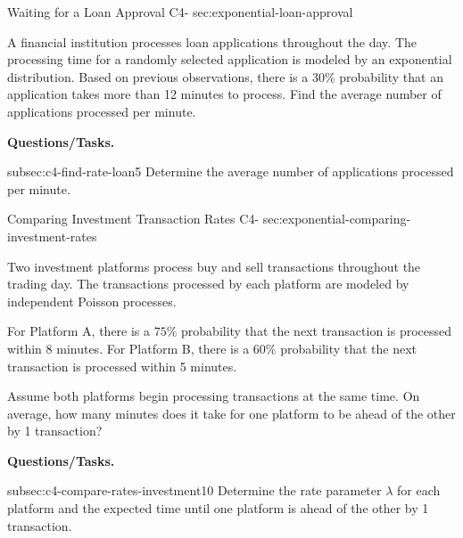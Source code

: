	
	
	\sectionScored
	{Waiting for a Loan Approval}
	{C4-}
	{sec:exponential-loan-approval}
	{
		A financial institution processes loan applications throughout the
		day. The processing time for a randomly selected application is
		modeled by an exponential distribution. Based on previous observations,
		there is a \(30\%\) probability that an application takes more than
		12 minutes to process. Find the average number of applications
		processed per minute.
		
		\textbf{Questions/Tasks.}
		\begin{enumerate}
			\CriterionTask
			{subsec:c4-find-rate-loan}{5}
			{Determine the average number of applications processed per minute.
				}
		\end{enumerate}
		
	}
	
	\sectionScored
	{Comparing Investment Transaction Rates}
	{C4-\sml{10}}
	{sec:exponential-comparing-investment-rates}
	{
		Two investment platforms process buy and sell transactions throughout
		the trading day. The transactions processed by each platform are
		modeled by independent Poisson processes.
		
		For Platform A, there is a \(75\%\) probability that the next
		transaction is processed within 8 minutes. For Platform B, there is a
		\(60\%\) probability that the next transaction is processed within
		5 minutes.
		
		Assume both platforms begin processing transactions at the same time.
		On average, how many minutes does it take for one platform to be ahead
		of the other by 1 transaction?
		
		\textbf{Questions/Tasks.}
		\begin{enumerate}
			\CriterionTask
			{subsec:c4-compare-rates-investment}{10}
			{Determine the rate parameter \(\lambda\) for each platform and
				the expected time until one platform is ahead of the other by
				1 transaction. \score{10}}
		\end{enumerate}
		
	}

	

